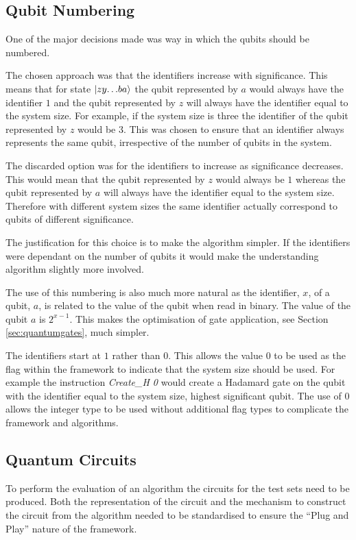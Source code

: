 \subsection{Qubit Numbering}
\label{sec:qubitnum}
One of the major decisions made was way in which the qubits should be numbered.

The chosen approach was that the identifiers increase with significance.
This means that for state $\left\vert{zy{\dots}ba}\right\rangle$ the qubit represented by $a$ would always have the identifier $1$ and the qubit represented by $z$ will always have the identifier equal to the system size.
For example, if the system size is three the identifier of the qubit represented by $z$ would be $3$.
This was chosen to ensure that an identifier always represents the same qubit, irrespective of the number of qubits in the system.

The discarded option was for the identifiers to increase as significance decreases.
This would mean that the qubit represented by $z$ would always be $1$ whereas the qubit represented by $a$ will always have the identifier equal to the system size.
Therefore with different system sizes the same identifier actually correspond to qubits of different  significance.

The justification for this choice is to make the algorithm simpler.
If the identifiers were dependant on the number of qubits it would make the understanding algorithm slightly more involved.

The use of this numbering is also much more natural as the identifier, $x$, of a qubit, $a$, is related to the value of the qubit when read in binary.
The value of the qubit $a$ is $2^{x-1}$.
This makes the optimisation of gate application, see Section \ref{sec:quantumgates}, much simpler.

The identifiers start at $1$ rather than $0$.
This allows the value $0$ to be used as the flag within the framework to indicate that the system size should be used.
For example the instruction \emph{Create\_H 0} would create a Hadamard gate on the qubit with the identifier equal to the system size, highest significant qubit.
The use of $0$ allows the integer type to be used without additional flag types to complicate the framework and algorithms.

\subsection{Quantum Circuits}
\label{sec:quantumcircuits}
To perform the evaluation of an algorithm the circuits for the test sets need to be produced.
Both the representation of the circuit and the mechanism to construct the circuit from the algorithm needed to be standardised to ensure the ``Plug and Play'' nature of the framework.

